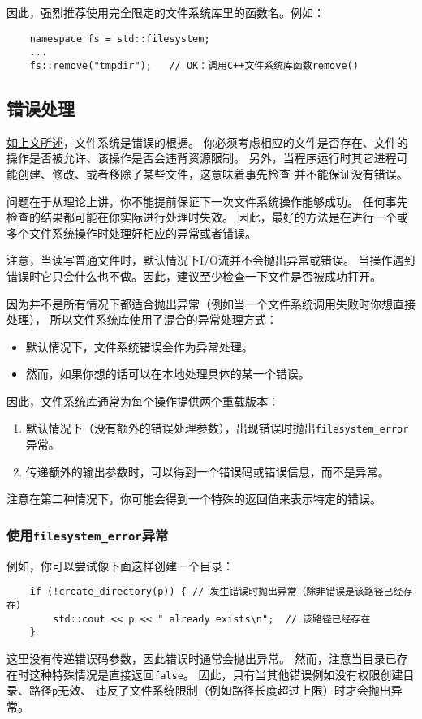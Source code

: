 因此，强烈推荐使用完全限定的文件系统库里的函数名。例如：
\begin{lstlisting}
    namespace fs = std::filesystem;
    ...
    fs::remove("tmpdir");   // OK：调用C++文件系统库函数remove()
\end{lstlisting}

\subsection{错误处理}
\hyperref[ch20.1.3.6]{如上文所述}，文件系统是错误的根据。
你必须考虑相应的文件是否存在、文件的操作是否被允许、该操作是否会违背资源限制。
另外，当程序运行时其它进程可能创建、修改、或者移除了某些文件，这意味着事先检查
并不能保证没有错误。

问题在于从理论上讲，你不能提前保证下一次文件系统操作能够成功。
任何事先检查的结果都可能在你实际进行处理时失效。
因此，最好的方法是在进行一个或多个文件系统操作时处理好相应的异常或者错误。

注意，当读写普通文件时，默认情况下I/O流并不会抛出异常或错误。
当操作遇到错误时它只会什么也不做。因此，建议至少检查一下文件是否被成功打开。

因为并不是所有情况下都适合抛出异常（例如当一个文件系统调用失败时你想直接处理），
所以文件系统库使用了混合的异常处理方式：
\begin{itemize}
    \item 默认情况下，文件系统错误会作为异常处理。
    \item 然而，如果你想的话可以在本地处理具体的某一个错误。
\end{itemize}
因此，文件系统库通常为每个操作提供两个重载版本：
\begin{enumerate}
    \item 默认情况下（没有额外的错误处理参数），出现错误时抛出\texttt{filesystem\_error}异常。
    \item 传递额外的输出参数时，可以得到一个错误码或错误信息，而不是异常。
\end{enumerate}
注意在第二种情况下，你可能会得到一个特殊的返回值来表示特定的错误。

\subsubsection{使用\texttt{filesystem\_error}异常}
例如，你可以尝试像下面这样创建一个目录：
\begin{lstlisting}
    if (!create_directory(p)) { // 发生错误时抛出异常（除非错误是该路径已经存在）
        std::cout << p << " already exists\n";  // 该路径已经存在
    }
\end{lstlisting}
这里没有传递错误码参数，因此错误时通常会抛出异常。
然而，注意当目录已存在时这种特殊情况是直接返回\texttt{false}。
因此，只有当其他错误例如没有权限创建目录、路径\texttt{p}无效、
违反了文件系统限制（例如路径长度超过上限）时才会抛出异常。

